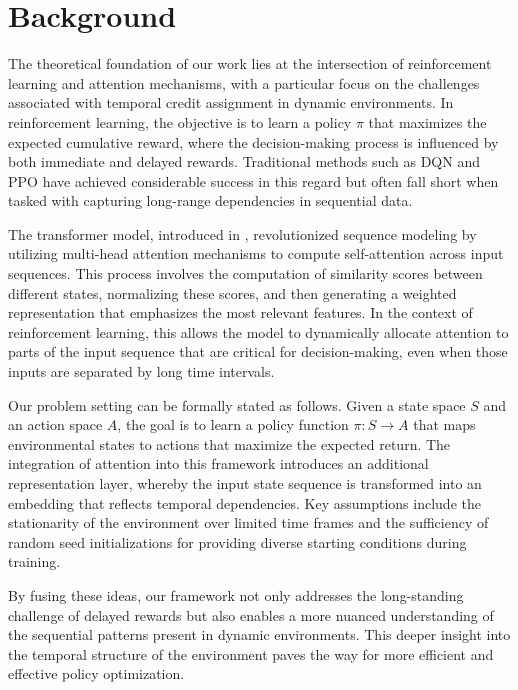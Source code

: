 \section{Background}
\label{sec:background}
The theoretical foundation of our work lies at the intersection of reinforcement learning and attention mechanisms, with a particular focus on the challenges associated with temporal credit assignment in dynamic environments. In reinforcement learning, the objective is to learn a policy \(\pi\) that maximizes the expected cumulative reward, where the decision-making process is influenced by both immediate and delayed rewards. Traditional methods such as DQN \cite{mnih_2015_dqn} and PPO \cite{schulman_2017_ppo} have achieved considerable success in this regard but often fall short when tasked with capturing long-range dependencies in sequential data.

The transformer model, introduced in \cite{ashish_2017_attention}, revolutionized sequence modeling by utilizing multi-head attention mechanisms to compute self-attention across input sequences. This process involves the computation of similarity scores between different states, normalizing these scores, and then generating a weighted representation that emphasizes the most relevant features. In the context of reinforcement learning, this allows the model to dynamically allocate attention to parts of the input sequence that are critical for decision-making, even when those inputs are separated by long time intervals.

Our problem setting can be formally stated as follows. Given a state space \(S\) and an action space \(A\), the goal is to learn a policy function \(\pi: S \rightarrow A\) that maps environmental states to actions that maximize the expected return. The integration of attention into this framework introduces an additional representation layer, whereby the input state sequence is transformed into an embedding that reflects temporal dependencies. Key assumptions include the stationarity of the environment over limited time frames and the sufficiency of random seed initializations for providing diverse starting conditions during training.

By fusing these ideas, our framework not only addresses the long-standing challenge of delayed rewards but also enables a more nuanced understanding of the sequential patterns present in dynamic environments. This deeper insight into the temporal structure of the environment paves the way for more efficient and effective policy optimization.

